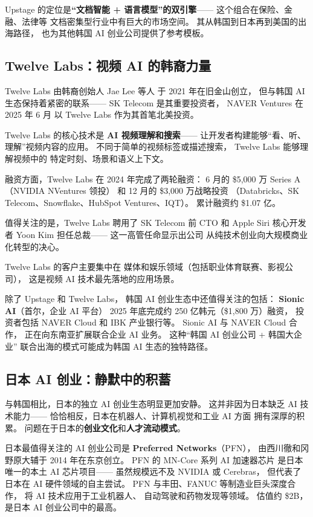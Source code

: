 Upstage 的定位是\textbf{``文档智能 + 语言模型''的双引擎}——
这个组合在保险、金融、法律等
文档密集型行业中有巨大的市场空间。
其从韩国到日本再到美国的出海路径，
也为其他韩国 AI 创业公司提供了参考模板。

\subsection{Twelve Labs：视频 AI 的韩裔力量}

Twelve Labs 由韩裔创始人 Jae Lee 等人
于 2021 年在旧金山创立，
但与韩国 AI 生态保持着紧密的联系——
SK Telecom 是其重要投资者，
NAVER Ventures 在 2025 年 6 月
以 Twelve Labs 作为其首笔北美投资。

Twelve Labs 的核心技术是
\textbf{AI 视频理解和搜索}——
让开发者构建能够``看、听、理解''视频内容的应用。
不同于简单的视频标签或描述搜索，
Twelve Labs 能够理解视频中的
特定时刻、场景和语义上下文。

融资方面，Twelve Labs 在 2024 年完成了两轮融资：
6 月的 \$5,000 万 Series A（NVIDIA NVentures 领投）
和 12 月的 \$3,000 万战略投资
（Databricks、SK Telecom、Snowflake、HubSpot Ventures、IQT）。
累计融资约 \$1.07 亿。

值得关注的是，Twelve Labs 聘用了
SK Telecom 前 CTO 和 Apple Siri 核心开发者 Yoon Kim
担任总裁——
这一高管任命显示出公司
从纯技术创业向大规模商业化转型的决心。

Twelve Labs 的客户主要集中在
媒体和娱乐领域（包括职业体育联赛、影视公司），
这是视频 AI 技术最先落地的应用场景。

除了 Upstage 和 Twelve Labs，
韩国 AI 创业生态中还值得关注的包括：
\textbf{Sionic AI}（首尔，企业 AI 平台）
2025 年底完成约 250 亿韩元（\$1,800 万）融资，
投资者包括 NAVER Cloud 和 IBK 产业银行等。
Sionic AI 与 NAVER Cloud 合作，
正在向东南亚扩展联合企业 AI 业务。
这种``韩国 AI 创业公司 + 韩国大企业''
联合出海的模式可能成为韩国 AI 生态的独特路径。

\subsection{日本 AI 创业：静默中的积蓄}

与韩国相比，日本的独立 AI 创业生态明显更加安静。
这并非因为日本缺乏 AI 技术能力——
恰恰相反，日本在机器人、计算机视觉和工业 AI 方面
拥有深厚的积累。
问题在于日本的\textbf{创业文化}和\textbf{人才流动模式}。

日本最值得关注的 AI 创业公司是
\textbf{Preferred Networks}（PFN），
由西川徹和冈野原大辅于 2014 年在东京创立。
PFN 的 MN-Core 系列 AI 加速器芯片
是日本唯一的本土 AI 芯片项目——
虽然规模远不及 NVIDIA 或 Cerebras，
但代表了日本在 AI 硬件领域的自主尝试。
PFN 与丰田、FANUC 等制造业巨头深度合作，
将 AI 技术应用于工业机器人、
自动驾驶和药物发现等领域。
估值约 \$2B，是日本 AI 创业公司中的最高。


